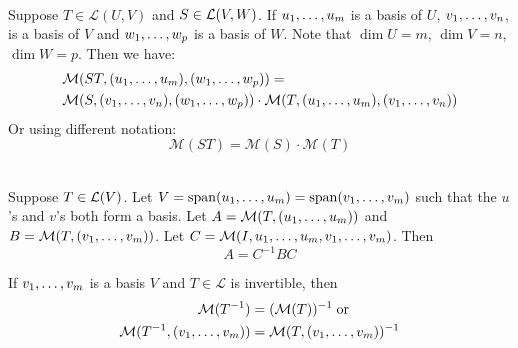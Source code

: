   \begin{thm}
     \\
    Suppose $T\in \mathcal{L}(U,V)$ and $S\in {\mathcal{L}(V,W)}$. If $u_1, \dots, u_m$ is a basis of $U$, $v_1, \dots, v_n$, is a basis of $V$ and $w_1, \dots, w_{p}$ is a basis of $W$. Note that $\dim U = m$, $\dim V = n$, $\dim W = p$. Then we have:
    \begin{equation}
    \begin{aligned}
      &\mathcal{M}(ST, (u_1, \dots, u_m), (w_1, \dots, w_{p})) = \\
      &\mathcal{M}(S, (v_1, \dots, v_n), (w_1, \dots, w_{p} ))
      \cdot
      \mathcal{M}(T, (u_1, \dots, u_m), (v_1, \dots, v_n   ))
    \end{aligned}
    \end{equation}
    Or using different notation:
    \begin{equation}
      \mathcal{M}(ST) = \mathcal{M}(S) \cdot \mathcal{M}(T)
    \end{equation}
  \end{thm}

  \setcounter{thm}{83}
  \begin{thm}
    \\
    Suppose $T \in \mathcal{L}(V)$. Let
    $V = \operatorname{span} (u_1, \dots, u_m) = \operatorname{span} (v_1, \dots, v_m)$ such that the $u$'s and $v$'s both form a basis. Let $A=\mathcal{M}(T, (u_1, \dots, u_m))$ and $B=\mathcal{M}(T,(v_1, \dots, v_m))$. Let
    $C=\mathcal{M}(I, u_1, \dots, u_m, v_1, \dots, v_m)$. Then
    \begin{equation}
    A = C^{-1} B C
    \end{equation}
  \end{thm}

  \setcounter{thm}{85}
  \begin{thm}
    If $v_1, \dots, v_m$ is a basis $V$ and $T\in \mathcal{L}$ is invertible, then
    \begin{equation}
      \begin{aligned}
        \mathcal{M}(T^{-1}) & = (\mathcal{M}(T))^{-1} \; \text{or} \\
        \mathcal{M}(T^{-1}, (v_1, \dots, v_m)) & =\mathcal{M}(T, (v_1, \dots, v_m))^{-1}
      \end{aligned}
    \end{equation}
  \end{thm}
